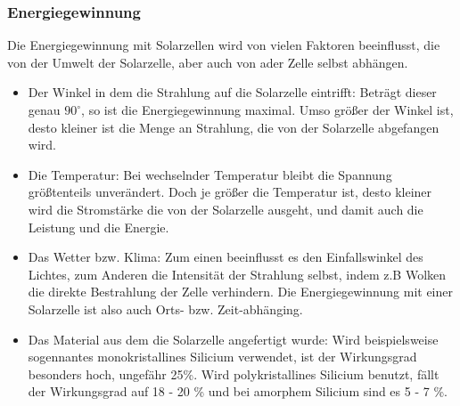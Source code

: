     \subsubsection{Energiegewinnung}                                    %
        \par Die Energiegewinnung mit Solarzellen wird von vielen Faktoren beeinflusst, die von der Umwelt der Solarzelle, aber auch von ader Zelle selbst abhängen.
        \begin{itemize}
            \item Der Winkel in dem die Strahlung auf die Solarzelle eintrifft: Beträgt dieser genau $90^{\circ}$, so ist die Energiegewinnung maximal. Umso größer der Winkel ist, desto kleiner ist die Menge an Strahlung, die von der Solarzelle abgefangen wird.
            \item Die Temperatur: Bei wechselnder Temperatur bleibt die Spannung größtenteils unverändert. Doch je größer die Temperatur ist, desto kleiner wird die Stromstärke die von der Solarzelle ausgeht, und damit auch die Leistung und die Energie.
            \item Das Wetter bzw. Klima: Zum einen beeinflusst es den Einfallswinkel des Lichtes, zum Anderen die Intensität der Strahlung selbst, indem z.B Wolken die direkte Bestrahlung der Zelle verhindern. Die Energiegewinnung mit einer Solarzelle ist also auch Orts- bzw. Zeit-abhänging.
            \item Das Material aus dem die Solarzelle angefertigt wurde: Wird beispielsweise sogennantes monokristallines Silicium verwendet, ist der Wirkungsgrad besonders hoch, ungefähr 25\%. Wird polykristallines Silicium benutzt, fällt der Wirkungsgrad auf 18 - 20 \% und bei amorphem Silicium sind es 5 - 7 \%. 
        \end{itemize}

